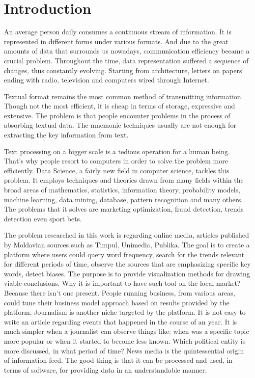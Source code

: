 \section*{Introduction}
\setcounter{page}{12}
An average person daily consumes a continuous stream of information. It is represented in different forms under various formats. And due to the great amounts of data that surrounds us nowadays, communication efficiency became a crucial problem. Throughout the time, data representation suffered a sequence of changes, thus constantly evolving. Starting from architecture, letters on papers ending with radio, television and computers wired through Internet.

Textual format remains the most common method of transmitting information. Though not the most efficient, it is cheap in terms of storage, expressive and extensive. The problem is that people encounter problems in the process of absorbing textual data. The mnemonic techniques usually are not enough for extracting the key information from text.

Text processing on a bigger scale is a tedious operation for a human being. That's why people resort to computers in order to solve the problem more efficiently. Data Science, a fairly new field in computer science, tackles this problem. It employs techniques and theories drawn from many fields within the broad areas of mathematics, statistics, information theory, probability models, machine learning, data mining, database, pattern recognition and many others. The problems that it solves are marketing optimization, fraud detection, trends detection even sport bets.

The problem researched in this work is regarding online media, articles published by Moldavian sources such as Timpul, Unimedia, Publika. The goal is to create a platform where users could query word frequency, search for the trends relevant for different periods of time, observe the sources that are emphasizing specific key words, detect biases. The purpose is to provide visualization methods for drawing viable conclusions. Why it is important to have such tool on the local market? Because there isn't one present. People running business, from various areas, could tune their business model approach based on results provided by the platform. Journalism is another niche targeted by the platform. It is not easy to write an article regarding events that happened in the course of an year. It is much simpler when a journalist can observe things like: when was a specific topic more popular or when it started to become less known. Which political entity is more discussed, in what period of time? News media is the quintessential origin of information feed. The good thing is that it can be processed and used, in terms of software, for providing data in an understandable manner.

